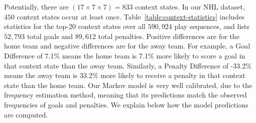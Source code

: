 \documentclass[]{article}
\begin{document}
Potentially, there are $(17 \times 7 \times 7) = 833$ context states. In our NHL dataset, $450$  context states occur at least once.
Table~\ref{table:context-statistics} includes statistics for the top-20 context states over all $590,924$ play sequences, and lists $52,793$ total goals and $89,612$ total penalties.
Positive differences are for the home team and negative differences are for the away team. For example, a Goal Difference of 7.1\% means the home team is 7.1\% more likely to score a goal in that context state than the away team. Similarly, a Penalty Difference of -33.2\% means the away team is 33.2\% more likely to receive a penalty in that context state than the home team. Our Markov model is very well calibrated, due to the frequency estimation method, meaning that its predictions match the observed frequencies of goals and penalties. We explain below how the model predictions are computed.
\end{document}
